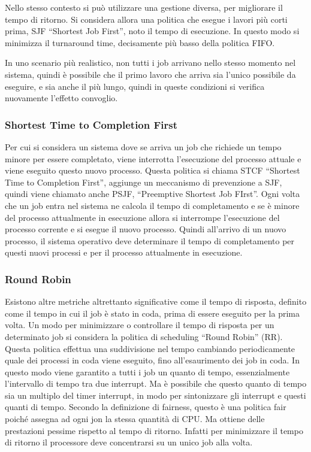 \documentclass{article}
\numberwithin{equation}{subsection}
\begin{document}
Nello stesso contesto si può utilizzare una gestione diversa, per migliorare il tempo di ritorno. Si considera allora una politica che esegue i lavori più corti prima, 
SJF ``Shortest Job First'', noto il tempo di esecuzione. In questo modo si minimizza il turnaround time, decisamente più basso della politica FIFO. 

In uno scenario più realistico, non tutti i job  arrivano nello stesso momento nel sistema, quindi è possibile che il primo lavoro che arriva sia l'unico possibile da 
eseguire, e sia anche il più lungo, quindi in queste condizioni si verifica nuovamente l'effetto convoglio. 

\subsubsection{Shortest Time to Completion First}

Per cui si considera un sistema dove se arriva un job che richiede un tempo minore per essere completato, viene interrotta l'esecuzione del processo attuale e viene 
eseguito questo nuovo processo. Questa politica si chiama STCF ``Shortest Time to Completion First'', aggiunge un meccanismo di prevenzione a SJF, quindi viene chiamato 
anche PSJF, ``Preemptive Shortest Job FIrst''. Ogni volta che un job entra nel sistema ne calcola il tempo di completamento e se è minore del processo attualmente in 
esecuzione allora si interrompe l'esecuzione del processo corrente e si esegue il nuovo processo. Quindi all'arrivo di un nuovo processo, il sistema operativo deve 
determinare il tempo di completamento per questi nuovi processi e per il processo attualmente in esecuzione. 

\subsubsection{Round Robin}

Esistono altre metriche altrettanto significative come il tempo di risposta, definito come il tempo in cui il job è stato in coda, prima di essere eseguito per la prima 
volta. Un modo per minimizzare o controllare il tempo di risposta per un determinato job si considera la politica di scheduling ``Round Robin'' (RR). Questa politica effettua 
una suddivisione nel tempo cambiando periodicamente quale dei processi in coda viene eseguito, fino all'esaurimento dei job in coda. In questo modo viene garantito a 
tutti i job un quanto di tempo, essenzialmente l'intervallo di tempo tra due interrupt. Ma è possibile che questo quanto di tempo sia un multiplo del timer interrupt, in 
modo per sintonizzare gli interrupt e questi quanti di tempo. Secondo la definizione di fairness, questo è una politica fair poiché assegna ad ogni jon la stessa quantità 
di CPU. Ma ottiene delle prestazioni pessime rispetto al tempo di ritorno. 
Infatti per minimizzare il tempo di ritorno il processore deve concentrarsi su un unico job alla volta. 
\end{document}
